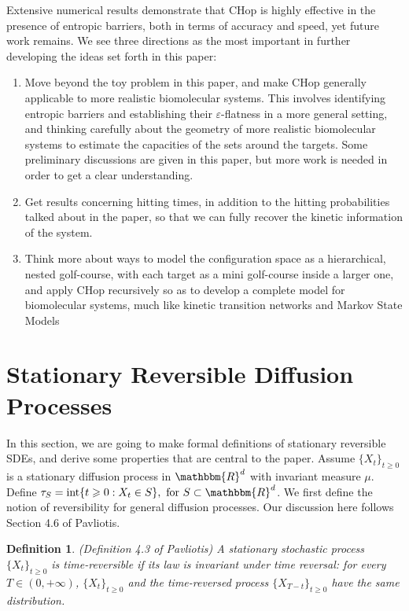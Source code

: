 \documentclass[english, aip, jcp, priprint, graphicx,floatfix]{revtex4-1}
\newtheorem{definition}{Definition}
\theoremstyle{plain}
\theoremstyle{definition}
\theoremstyle{plain}
\begin{document}
Extensive numerical results demonstrate that CHop is highly effective in the presence of entropic barriers, both in terms of accuracy and speed, yet future work remains. We see three directions as the most important in further developing the ideas set forth in this paper:
\begin{enumerate}
	\item Move beyond the toy problem in this paper, and make CHop generally applicable to more realistic biomolecular systems. This involves identifying entropic barriers and establishing their $\varepsilon$-flatness in a more general setting, and thinking carefully about the geometry of more realistic biomolecular systems to estimate the capacities of the sets around the targets. Some preliminary discussions are given in this paper, but more work is needed in order to get a clear understanding.
	\item Get results concerning hitting times, in addition to the hitting probabilities talked about in the paper, so that we can fully recover the kinetic information of the system.
	\item Think more about ways to model the configuration space as a hierarchical, nested golf-course, with each target as a mini golf-course inside a larger one, and apply CHop recursively so as to develop a complete model for biomolecular systems, much like kinetic transition networks\cite{Noe2006-cs, Wales2006-ur} and Markov State Models \cite{Pande2010-yi, Chodera2014-bh, Husic2018-xp}
\end{enumerate}

\appendix

\section{Stationary Reversible Diffusion Processes}\label{sec:reversible_diffusion}

In this section, we are going to make formal definitions of stationary
reversible SDEs, and derive some properties that are central to the paper.
Assume $\{X_t\}_{t \geqslant 0}$ is a stationary diffusion process in
$\mathbbm{R}^d$ with invariant measure ${\mu}$. Define $\tau_S
=\ensuremath{\operatorname{int}} \{ t \geqslant 0 : X_t \in S \} , \text{ for
} S \subset \mathbbm{R}^d$. We first define the notion of reversibility for
general diffusion processes. Our discussion here follows Section 4.6 of
Pavliotis\cite{Pavliotis2016-xn}.

\begin{definition}
(Definition 4.3 of Pavliotis\cite{Pavliotis2016-xn}) A stationary stochastic
process $\{X_t\}_{t \geqslant 0}$ is time-reversible if its law is invariant under time
reversal: for every $T \in (0, + \infty)$, $\{X_t\}_{t \geqslant 0}$ and the time-reversed
process $\{X_{T - t}\}_{t \geqslant 0}$ have the same distribution.
\end{definition}
\end{document}
